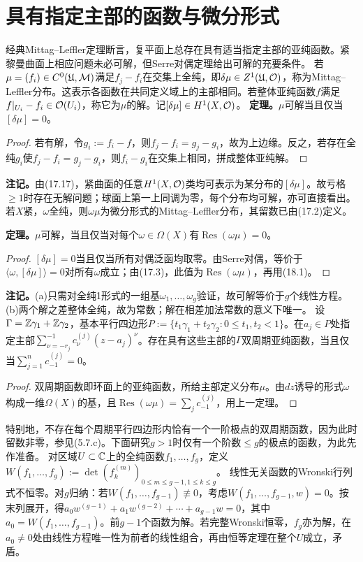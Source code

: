 \section{具有指定主部的函数与微分形式}
经典Mittag--Leffler定理断言，复平面上总存在具有适当指定主部的亚纯函数。紧黎曼曲面上相应问题未必可解，但Serre对偶定理给出可解的充要条件。
若$\mu=(f_i)\in C^0(\mathfrak U,\mathcal M)$满足$f_j-f_i$在交集上全纯，即$\delta\mu\in Z^1(\mathfrak U,\mathcal O)$，称为Mittag--Leffler分布。这表示各函数在共同定义域上的主部相同。若整体亚纯函数$f$满足$f|_{U_i}-f_i\in\mathcal O(U_i)$，称它为$\mu$的解。记$[\delta\mu]\in H^1(X,\mathcal O)$。
\textbf{定理。}$\mu$可解当且仅当$[\delta\mu]=0$。
\begin{proof}
若有解，令$g_i:=f_i-f$，则$f_j-f_i=g_j-g_i$，故为上边缘。反之，若存在全纯$g_i$使$f_j-f_i=g_j-g_i$，则$f_i-g_i$在交集上相同，拼成整体亚纯解。
\end{proof}
\textbf{注记。}由(17.17)，紧曲面的任意$H^1(X,\mathcal O)$类均可表示为某分布的$[\delta\mu]$。故亏格$\ge1$时存在无解问题；球面上第一上同调为零，每个分布均可解，亦可直接看出。
若$X$紧，$\omega$全纯，则$\omega\mu$为微分形式的Mittag--Leffler分布，其留数已由(17.2)定义。

\textbf{定理。}$\mu$可解，当且仅当对每个$\omega\in\Omega(X)$有$\operatorname{Res}(\omega\mu)=0$。
\begin{proof}
$[\delta\mu]=0$当且仅当所有对偶泛函均取零。由Serre对偶，等价于$\langle\omega,[\delta\mu]\rangle=0$对所有$\omega$成立；由(17.3)，此值为$\operatorname{Res}(\omega\mu)$，再用(18.1)。
\end{proof}
\textbf{注记。}(a)只需对全纯1形式的一组基$\omega_1,\ldots,\omega_g$验证，故可解等价于$g$个线性方程。
(b)两个解之差整体全纯，故为常数；解在相差加法常数的意义下唯一。
设$\Gamma=\mathbb Z\gamma_1+\mathbb Z\gamma_2$，基本平行四边形$P:=\{t_1\gamma_1+t_2\gamma_2:0\le t_1,t_2<1\}$。在$a_j\in P$处指定主部$\sum_{\nu=-r_j}^{-1}c_\nu^{(j)}(z-a_j)^\nu$。存在具有这些主部的$\Gamma$双周期亚纯函数，当且仅当$\sum_{j=1}^nc_{-1}^{(j)}=0$。
\begin{proof}
双周期函数即环面上的亚纯函数，所给主部定义分布$\mu$。由$dz$诱导的形式$\omega$构成一维$\Omega(X)$的基，且$\operatorname{Res}(\omega\mu)=\sum_jc_{-1}^{(j)}$，用上一定理。
\end{proof}
特别地，不存在每个周期平行四边形内恰有一个一阶极点的双周期函数，因为此时留数非零，参见(5.7.c)。下面研究$g>1$时仅有一个阶数$\le g$的极点的函数，为此先作准备。
对区域$U\subset\mathbb C$上的全纯函数$f_1,\ldots,f_g$，定义$W(f_1,\ldots,f_g):=\det(f_k^{(m)})_{0\le m\le g-1,1\le k\le g}$。
线性无关函数的Wronski行列式不恒零。对$g$归纳：若$W(f_1,\ldots,f_{g-1})\not\equiv0$，考虑$W(f_1,\ldots,f_{g-1},w)=0$。按末列展开，得$a_0w^{(g-1)}+a_1w^{(g-2)}+\cdots+a_{g-1}w=0$，其中$a_0=W(f_1,\ldots,f_{g-1})$。前$g-1$个函数为解。若完整Wronski恒零，$f_g$亦为解，在$a_0\ne0$处由线性方程唯一性为前者的线性组合，再由恒等定理在整个$U$成立，矛盾。


